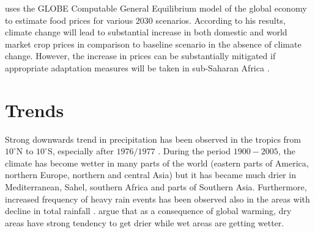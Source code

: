 \documentclass[a4paper,12pt]{article}
\begin{document}
\cite{OxfamIDS} uses the GLOBE Computable General Equilibrium model of the global economy to estimate food prices for various $2030$ scenarios. According to his results, climate change will lead to substantial increase in both domestic and world market crop prices in comparison to baseline scenario in the absence of climate change. However, the increase in prices can be substantially mitigated if appropriate adaptation measures will be taken in sub-Saharan Africa \citep{OxfamIDS}.

\section*{Trends}

 Strong downwards trend in precipitation has been observed in the tropics from $10^\circ$N to $10^\circ$S, especially after $1976/1977$ \citep{IPCCtrenberth}. During the period $1900-2005$, the climate has become wetter in many parts of the world (eastern parts of America, northern Europe, northern and central Asia) but it has became much drier in Mediterranean, Sahel, southern Africa and parts of Southern Asia. Furthermore, increased frequency of heavy rain events has been observed also in the areas with decline in total rainfall \citep{IPCCtrenberth}. \cite{Trenberth2014} argue that as a consequence of global warming, dry areas have strong tendency to get drier while wet areas are getting wetter. 
 


\end{document}
